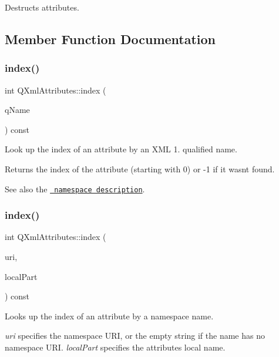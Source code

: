 Destructs attributes. 

\subsection{Member Function Documentation}
\mbox{\label{class_q_xml_attributes_a5d219582743f952156f1bf66fe843ea4}} 
\subsubsection{\texorpdfstring{index()}{index()}\hspace{0.1cm}{\footnotesize\ttfamily [1/2]}}
{\footnotesize\ttfamily int Q\+Xml\+Attributes\+::index (\begin{DoxyParamCaption}\item[{const \mbox{\hyperlink{class_q_string}{Q\+String}} \&}]{q\+Name }\end{DoxyParamCaption}) const}

Look up the index of an attribute by an X\+ML 1. qualified name.

Returns the index of the attribute (starting with 0) or -\/1 if it wasn\textquotesingle{}t found.

See also the \href{xml-sax.html\#namespaces}{\texttt{ namespace description}}. \mbox{\label{class_q_xml_attributes_a4aadf1fb97f9c69f9b9c4079d7c9b630}} 
\subsubsection{\texorpdfstring{index()}{index()}\hspace{0.1cm}{\footnotesize\ttfamily [2/2]}}
{\footnotesize\ttfamily int Q\+Xml\+Attributes\+::index (\begin{DoxyParamCaption}\item[{const \mbox{\hyperlink{class_q_string}{Q\+String}} \&}]{uri,  }\item[{const \mbox{\hyperlink{class_q_string}{Q\+String}} \&}]{local\+Part }\end{DoxyParamCaption}) const}

Looks up the index of an attribute by a namespace name.

{\itshape uri} specifies the namespace U\+RI, or the empty string if the name has no namespace U\+RI. {\itshape local\+Part} specifies the attribute\textquotesingle{}s local name.

